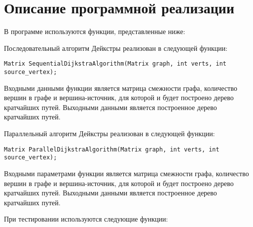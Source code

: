 \documentclass{report}
\begin{document}
\section*{Описание программной реализации}
В программе используются функции, представленные ниже:
\par Последовательный алгоритм Дейкстры реализован в следующей функции:
\begin{lstlisting}
Matrix SequentialDijkstraAlgorithm(Matrix graph, int verts, int source_vertex);
\end{lstlisting}
\par Входными данными функции является матрица смежности графа, количество вершин в графе и вершина-источник, для которой и будет построено дерево кратчайших путей. Выходными данными является построенное дерево кратчайших путей.
\par Параллельный алгоритм Дейкстры реализован в следующей функции:
\begin{lstlisting}
Matrix ParallelDijkstraAlgorithm(Matrix graph, int verts, int source_vertex);
\end{lstlisting}
\par Входными параметрами функции является матрица смежности графа, количество вершин в графе и вершина-источник, для которой и будет построено дерево кратчайших путей. Выходными данными является построенное дерево кратчайших путей.
\par При тестировании используются следующие функции:
\end{document}
